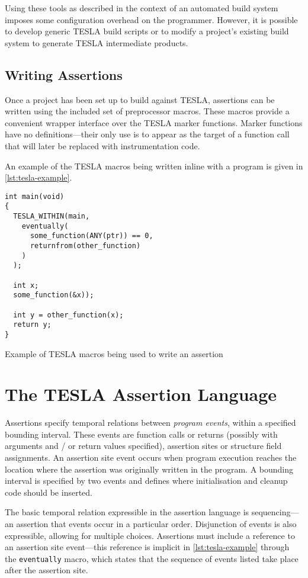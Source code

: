 Using these tools as described in the context of an automated build system
imposes some configuration overhead on the programmer. However, it is
possible to develop generic TESLA build scripts or to modify a project's
existing build system to generate TESLA intermediate products.

\subsection{Writing Assertions}

Once a project has been set up to build against TESLA, assertions can be
written using the included set of preprocessor macros. These macros
provide a convenient wrapper interface over the TESLA marker functions.
Marker functions have no definitions---their only use is to appear as
the target of a function call that will later be replaced with
instrumentation code.

An example of the TESLA macros being written inline with a program is
given in \autoref{lst:tesla-example}.

\begin{listing}
  \begin{verbatim}
int main(void)
{
  TESLA_WITHIN(main,
    eventually(
      some_function(ANY(ptr)) == 0,
      returnfrom(other_function)
    )
  );

  int x;
  some_function(&x));

  int y = other_function(x);
  return y;
}
  \end{verbatim}
  \caption{Example of TESLA macros being used to write an assertion}
  \label{lst:tesla-example}
\end{listing}

\section{The TESLA Assertion Language} \label{sec:assertions}

Assertions specify temporal relations between \emph{program events},
within a specified bounding interval. These events are function calls or
returns (possibly with arguments and / or return values specified),
assertion sites or structure field assignments. An assertion site event
occurs when program execution reaches the location where the assertion
was originally written in the program. A bounding interval is specified
by two events and defines where initialisation and cleanup code should
be inserted.

The basic temporal relation expressible in the assertion language is
sequencing---an assertion that events occur in a particular order.
Disjunction of events is also expressible, allowing for multiple
choices. Assertions must include a reference to an assertion site
event---this reference is implicit in \autoref{lst:tesla-example}
through the \texttt{eventually} macro, which states that the
sequence of events listed take place after the assertion site.

